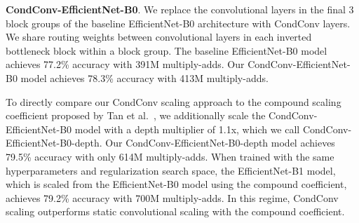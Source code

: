 \documentclass{article}
\def\codename{CondConv}
\begin{document}
\textbf{\codename{}-EfficientNet-B0}. We replace the convolutional layers in the final 3 block groups of the baseline EfficientNet-B0 architecture with \codename{} layers. We share routing weights between convolutional layers in each inverted bottleneck block within a block group. The baseline EfficientNet-B0 model achieves 77.2\% accuracy with 391M multiply-adds. Our \codename{}-EfficientNet-B0 model achieves 78.3\% accuracy with 413M multiply-adds. 

To directly compare our \codename{} scaling approach to the compound scaling coefficient proposed by Tan et al.~\cite{tan2019efficientnet}, we additionally scale the \codename{}-EfficientNet-B0 model with a depth multiplier of 1.1x, which we call \codename{}-EfficientNet-B0-depth. Our \codename{}-EfficientNet-B0-depth model achieves 79.5\% accuracy with only 614M multiply-adds. When trained with the same hyperparameters and regularization search space, the EfficientNet-B1 model, which is scaled from the EfficientNet-B0 model using the compound coefficient, achieves 79.2\% accuracy with 700M multiply-adds. In this regime, \codename{} scaling outperforms static convolutional scaling with the compound coefficient.
\end{document}
